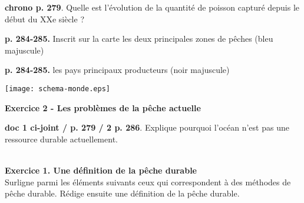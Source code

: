 \documentclass[12pt]{article}
\begin{document}
\begin{enumerate}
\item \textbf{chrono p. 279}. Quelle est l'évolution de la quantité de poisson capturé depuis le début du XXe siècle ?\\
 \vspace{1cm}

\begin{minipage}{3cm}
 \item \textbf{p. 284-285.} Inscrit sur la carte les deux principales zones de pêches (bleu majuscule)\\
\item \textbf{p. 284-285.} les pays principaux producteurs (noir majuscule)
 \end{minipage}
 \begin{minipage}{10cm}
 \texttt{[image: schema-monde.eps]}
 \end{minipage}


\vspace{1cm}
\textbf{Exercice 2 - Les problèmes de la pêche actuelle}\\
\begin{minipage}{12cm}
\item \textbf{doc 1 ci-joint / p. 279 / 2 p. 286}. Explique pourquoi l'océan n'est pas une ressource durable actuellement.
\vspace{6cm}
\end{minipage}
\end{enumerate}

\newpage
{}\\

\textbf{Exercice 1. Une définition de la pêche durable}\\
Surligne parmi les éléments suivants ceux qui correspondent à des méthodes de pêche durable. Rédige ensuite une définition de la pêche durable.\\
\end{document}
